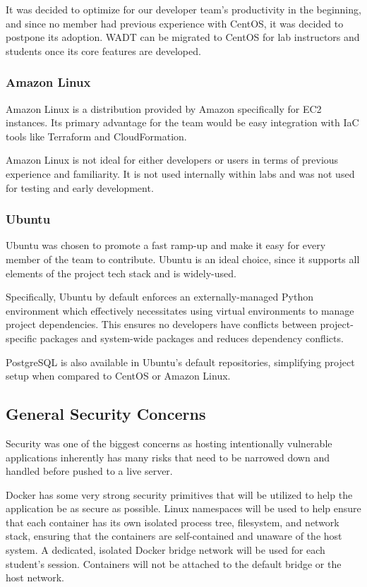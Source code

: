 \documentclass[12pt,titlepage]{article}
\begin{document}
It was decided to optimize for our developer team's productivity in the beginning, and since no member had previous experience with CentOS, it was decided to postpone its adoption. WADT can be migrated to CentOS for lab instructors and students once its core features are developed.

\subsubsection{Amazon Linux}
Amazon Linux is a distribution provided by Amazon specifically for EC2 instances. Its primary advantage for the team would be easy integration with IaC tools like Terraform and CloudFormation.

Amazon Linux is not ideal for either developers or users in terms of previous experience and familiarity. It is not used internally within labs and was not used for testing and early development.

\subsubsection{Ubuntu}
Ubuntu was chosen to promote a fast ramp-up and make it easy for every member of the team to contribute. Ubuntu is an ideal choice, since it supports all elements of the project tech stack and is widely-used.

Specifically, Ubuntu by default enforces an externally-managed Python environment which effectively necessitates using virtual environments to manage project dependencies. This ensures no developers have conflicts between project-specific packages and system-wide packages and reduces dependency conflicts.

PostgreSQL is also available in Ubuntu's default repositories, simplifying project setup when compared to CentOS or Amazon Linux.

\subsection{General Security Concerns}
Security was one of the biggest concerns as hosting intentionally vulnerable applications inherently has many risks that need to be narrowed down and handled before pushed to a live server.

Docker has some very strong security primitives that will be utilized to help the application be as secure as possible. Linux namespaces will be used to help ensure that each container has its own isolated process tree, filesystem, and network stack, ensuring that the containers are self-contained and unaware of the host system. A dedicated, isolated Docker bridge network will be used for each student's session. Containers will not be attached to the default bridge or the host network.
\end{document}
